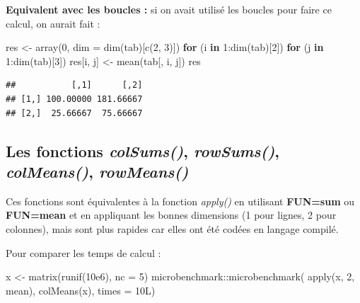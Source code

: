 \documentclass[
]{book}
\newenvironment{Shaded}{\begin{snugshade}}{\end{snugshade}}
\newcommand{\AttributeTok}[1]{\textcolor[rgb]{0.77,0.63,0.00}{#1}}
\newcommand{\ControlFlowTok}[1]{\textcolor[rgb]{0.13,0.29,0.53}{\textbf{#1}}}
\newcommand{\DecValTok}[1]{\textcolor[rgb]{0.00,0.00,0.81}{#1}}
\newcommand{\FloatTok}[1]{\textcolor[rgb]{0.00,0.00,0.81}{#1}}
\newcommand{\FunctionTok}[1]{\textcolor[rgb]{0.00,0.00,0.00}{#1}}
\newcommand{\NormalTok}[1]{#1}
\newcommand{\OtherTok}[1]{\textcolor[rgb]{0.56,0.35,0.01}{#1}}
\newcommand{\SpecialCharTok}[1]{\textcolor[rgb]{0.00,0.00,0.00}{#1}}
\theoremstyle{definition}
\theoremstyle{definition}
\theoremstyle{definition}
\theoremstyle{definition}
\theoremstyle{remark}
\begin{document}
\textbf{Equivalent avec les boucles :} si on avait utilisé les boucles pour faire ce calcul, on aurait fait :

\begin{Shaded}
\begin{Highlighting}[]
\NormalTok{res }\OtherTok{\textless{}{-}} \FunctionTok{array}\NormalTok{(}\DecValTok{0}\NormalTok{, }\AttributeTok{dim =} \FunctionTok{dim}\NormalTok{(tab)[}\FunctionTok{c}\NormalTok{(}\DecValTok{2}\NormalTok{, }\DecValTok{3}\NormalTok{)])}
\ControlFlowTok{for}\NormalTok{ (i }\ControlFlowTok{in} \DecValTok{1}\SpecialCharTok{:}\FunctionTok{dim}\NormalTok{(tab)[}\DecValTok{2}\NormalTok{])}
  \ControlFlowTok{for}\NormalTok{ (j }\ControlFlowTok{in} \DecValTok{1}\SpecialCharTok{:}\FunctionTok{dim}\NormalTok{(tab)[}\DecValTok{3}\NormalTok{])}
\NormalTok{    res[i, j] }\OtherTok{\textless{}{-}} \FunctionTok{mean}\NormalTok{(tab[, i, j])}
\NormalTok{res}
\end{Highlighting}
\end{Shaded}

\begin{verbatim}
##           [,1]      [,2]
## [1,] 100.00000 181.66667
## [2,]  25.66667  75.66667
\end{verbatim}

\hypertarget{les-fonctions-colsums-rowsums-colmeans-rowmeans}{%
\subsection{\texorpdfstring{Les fonctions \emph{colSums()}, \emph{rowSums()}, \emph{colMeans()}, \emph{rowMeans()}}{Les fonctions colSums(), rowSums(), colMeans(), rowMeans()}}\label{les-fonctions-colsums-rowsums-colmeans-rowmeans}}

Ces fonctions sont équivalentes à la fonction \emph{apply()} en utilisant \textbf{FUN=sum} ou \textbf{FUN=mean} et en appliquant les bonnes dimensions (1 pour lignes, 2 pour colonnes), mais sont plus rapides car elles ont été codées en langage compilé.

Pour comparer les temps de calcul :

\begin{Shaded}
\begin{Highlighting}[]
\NormalTok{x }\OtherTok{\textless{}{-}} \FunctionTok{matrix}\NormalTok{(}\FunctionTok{runif}\NormalTok{(}\FloatTok{10e6}\NormalTok{), }\AttributeTok{nc =} \DecValTok{5}\NormalTok{)}
\NormalTok{ microbenchmark}\SpecialCharTok{::}\FunctionTok{microbenchmark}\NormalTok{(}
   \FunctionTok{apply}\NormalTok{(x, }\DecValTok{2}\NormalTok{, mean),}
   \FunctionTok{colMeans}\NormalTok{(x),}
   \AttributeTok{times =}\NormalTok{ 10L)}
\end{Highlighting}
\end{Shaded}
\end{document}
